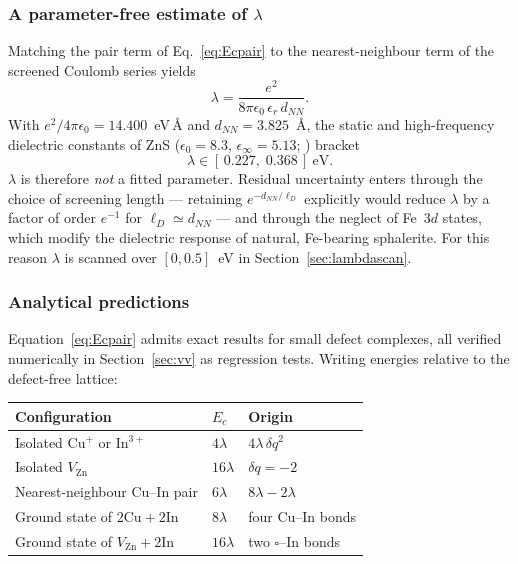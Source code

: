 \documentclass[11pt,a4paper]{article}
\begin{document}
\subsubsection{A parameter-free estimate of \texorpdfstring{$\lambda$}{lambda}}

Matching the pair term of Eq.~\eqref{eq:Ecpair} to the nearest-neighbour term of
the screened Coulomb series yields
\begin{equation}
\lambda = \frac{e^2}{8\pi\epsilon_0\,\epsilon_r\, d_{NN}} .
\label{eq:lambda}
\end{equation}
With $e^2/4\pi\epsilon_0 = 14.400$~eV\,\AA{} and $d_{NN} = 3.825$~\AA{}, the
static and high-frequency dielectric constants of ZnS ($\epsilon_0 = 8.3$,
$\epsilon_\infty = 5.13$; \citealp{berlincourt1963,li1984}) bracket
\begin{equation}
\lambda \in [\,0.227,\; 0.368\,]\ \mathrm{eV}.
\end{equation}
$\lambda$ is therefore \emph{not} a fitted parameter. Residual uncertainty
enters through the choice of screening length --- retaining
$e^{-d_{NN}/\ell_D}$ explicitly would reduce $\lambda$ by a factor of order
$e^{-1}$ for $\ell_D \simeq d_{NN}$ --- and through the neglect of Fe~$3d$
states, which modify the dielectric response of natural, Fe-bearing sphalerite.
For this reason $\lambda$ is scanned over $[0, 0.5]$~eV in
Section~\ref{sec:lambdascan}.

\subsubsection{Analytical predictions}
\label{sec:analytic}

Equation~\eqref{eq:Ecpair} admits exact results for small defect complexes, all
verified numerically in Section~\ref{sec:vv} as regression tests. Writing
energies relative to the defect-free lattice:

\begin{center}
\small
\begin{tabular}{lll}
\toprule
Configuration & $E_c$ & Origin \\
\midrule
Isolated $\mathrm{Cu^{+}}$ or $\mathrm{In^{3+}}$ & $4\lambda$ & $4\lambda\,\delta q^2$ \\
Isolated $V_{\mathrm{Zn}}$ & $16\lambda$ & $\delta q = -2$ \\
Nearest-neighbour Cu--In pair & $6\lambda$ & $8\lambda - 2\lambda$ \\
Ground state of $2\mathrm{Cu} + 2\mathrm{In}$ & $8\lambda$ & four Cu--In bonds \\
Ground state of $V_{\mathrm{Zn}} + 2\mathrm{In}$ & $16\lambda$ & two $\square$--In bonds \\
\bottomrule
\end{tabular}
\end{center}
\end{document}
